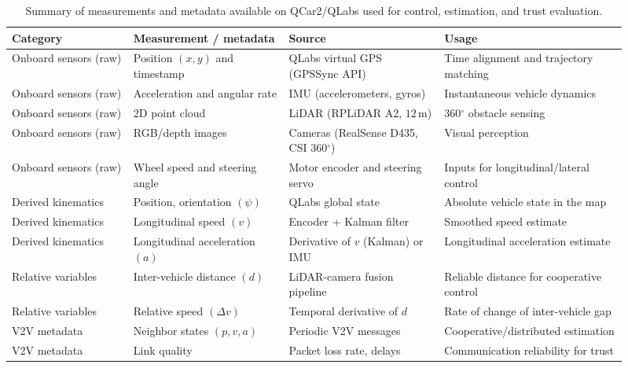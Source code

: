 \begin{table}[ht!]
	\centering
	\caption{Summary of measurements and metadata available on QCar2/QLabs used for control, estimation, and trust evaluation.}
	\label{tab:ch6_qcar_measurements}
	\small
	\setlength{\tabcolsep}{4pt}
	\renewcommand{\arraystretch}{1.12}
	\begin{tabular}{p{0.18\linewidth} p{0.23\linewidth} p{0.23\linewidth} p{0.27\linewidth}}
		\hline
			\textbf{Category} & \textbf{Measurement / metadata} & \textbf{Source} & \textbf{Usage} \\
		\hline
		Onboard sensors (raw) & Position $(x,y)$ and timestamp & QLabs virtual GPS (GPSSync API) & Time alignment and trajectory matching \\
		Onboard sensors (raw) & Acceleration and angular rate & IMU (accelerometers, gyros) & Instantaneous vehicle dynamics \\
		Onboard sensors (raw) & 2D point cloud & LiDAR (RPLiDAR A2, $12\,\mathrm{m}$) & 360$^\circ$ obstacle sensing \\
		Onboard sensors (raw) & RGB/depth images & Cameras (RealSense D435, CSI 360$^\circ$) & Visual perception \\
		Onboard sensors (raw) & Wheel speed and steering angle & Motor encoder and steering servo & Inputs for longitudinal/lateral control \\
		Derived kinematics & Position, orientation $(\psi)$ & QLabs global state & Absolute vehicle state in the map \\
		Derived kinematics & Longitudinal speed $(v)$ & Encoder + Kalman filter & Smoothed speed estimate \\
		Derived kinematics & Longitudinal acceleration $(a)$ & Derivative of $v$ (Kalman) or IMU & Longitudinal acceleration estimate \\
		Relative variables & Inter-vehicle distance $(d)$ & LiDAR-camera fusion pipeline & Reliable distance for cooperative control \\
		Relative variables & Relative speed $(\Delta v)$ & Temporal derivative of $d$ & Rate of change of inter-vehicle gap \\
		V2V metadata & Neighbor states $(p,v,a)$ & Periodic V2V messages & Cooperative/distributed estimation \\
		V2V metadata & Link quality & Packet loss rate, delays & Communication reliability for trust \\
		\hline
	\end{tabular}
\end{table}

